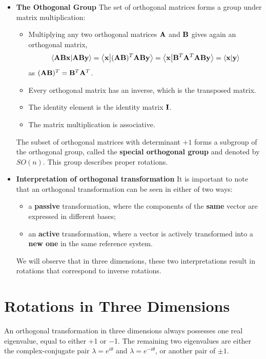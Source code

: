 \documentclass[12pt]{article}
\begin{document}
\begin{itemize}
  \item \textbf{The Othogonal Group} The set of orthogonal matrices forms a group under matrix multiplication:
     \begin{itemize}
      \item Multiplying any two orthogonal matrices $\vb{A}$ and $\vb{B}$ gives again an orthogonal matrix,
      \[
        \ip{\vb{A}\vb{B}\vb{x}}{\vb{A}\vb{B}\vb{y}} = \ip{\vb{x}}{(\vb{A}\vb{B})^T\vb{A}\vb{B}\vb{y}}
        =\ip{\vb{x}}{\vb{B}^T\vb{A}^T\vb{A}\vb{B}\vb{y}} = \ip{\vb{x}}{ \vb{y}}
      \]
      as $(\vb{A}\vb{B})^T=\vb{B}^T\vb{A}^T$.
      \item Every orthogonal matrix has an inverse, which is the transposed matrix.
      \item The identity element is the identity matrix $\vb I$.
      \item The matrix multiplication is associative.
      \end{itemize}
      The subset of orthogonal matrices with determinant $+1$ forms a subgroup of the orthogonal
group, called the \textbf{special orthogonal group} and denoted by $SO(n)$. This group
describes proper rotations.
  \item \textbf{Interpretation of orthogonal transformation} It is important to note that
        an orthogonal transformation can be seen in either of two ways:
        \begin{itemize}
          \item a \textbf{passive} transformation, where the components of the \textbf{same}
                vector are expressed in different bases;
          \item an \textbf{active} transformation, where a vector is actively transformed into
                a \textbf{new one} in the same reference system.
        \end{itemize}
        We will observe that in three dimensions, these two interpretations result in rotations
        that correspond to inverse rotations.

\end{itemize}

\section{Rotations in Three Dimensions}

An orthogonal transformation in three dimensions always possesses one real eigenvalue, equal to either +1 or −1.
 The remaining two eigenvalues are either the complex-conjugate pair $\lambda = e^{i\theta}$ and $\lambda = e^{-i\theta}$,
 or another pair of $\pm 1$.
\end{document}
